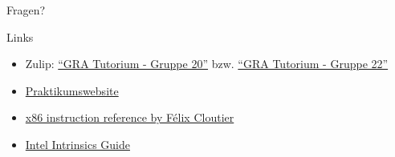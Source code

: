 \begin{frame}[c]{}{}
	\begin{center}
		\LARGE Fragen?
	\end{center}
\end{frame}

\begin{frame}[fragile, c]{Links}{}
	\begin{itemize}
		\item Zulip: \href{https://zulip.in.tum.de/#narrow/stream/2267-GRA-Tutorium---Gruppe-20}{\enquote{GRA Tutorium - Gruppe 20}}
		      bzw. \href{https://zulip.in.tum.de/#narrow/stream/2269-GRA-Tutorium---Gruppe-22}{\enquote{GRA Tutorium - Gruppe 22}}
		\item \href{https://gra.caps.in.tum.de}{Praktikumswebsite}
		\item \href{https://www.felixcloutier.com/x86/}{x86 instruction reference by Félix Cloutier}
		\item \href{https://www.intel.com/content/www/us/en/docs/intrinsics-guide/index.html#}{Intel Intrinsics Guide}
	\end{itemize}
\end{frame}

\maketitle



